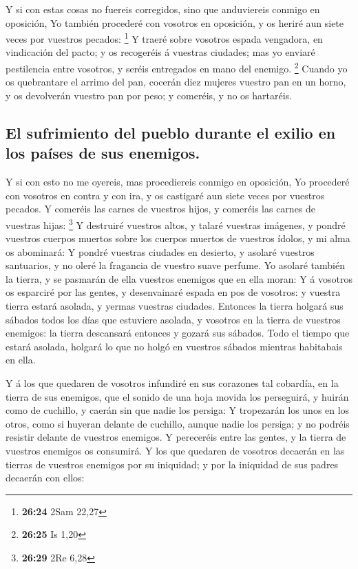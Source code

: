  Y si con estas cosas no fuereis corregidos, sino que
anduviereis conmigo en oposición,  Yo también procederé
con vosotros en oposición, y os heriré aun siete veces por vuestros
pecados: \footnote{\textbf{26:24} 2Sam 22,27}  Y traeré
sobre vosotros espada vengadora, en vindicación del pacto; y os
recogeréis á vuestras ciudades; mas yo enviaré pestilencia entre
vosotros, y seréis entregados en mano del enemigo. \footnote{\textbf{26:25}
  Is 1,20}  Cuando yo os quebrantare el arrimo del pan,
cocerán diez mujeres vuestro pan en un horno, y os devolverán vuestro
pan por peso; y comeréis, y no os hartaréis.

\hypertarget{el-sufrimiento-del-pueblo-durante-el-exilio-en-los-pauxedses-de-sus-enemigos.}{%
\subsection{El sufrimiento del pueblo durante el exilio en los países de
sus
enemigos.}\label{el-sufrimiento-del-pueblo-durante-el-exilio-en-los-pauxedses-de-sus-enemigos.}}

 Y si con esto no me oyereis, mas procediereis conmigo en
oposición,  Yo procederé con vosotros en contra y con
ira, y os castigaré aun siete veces por vuestros pecados.
 Y comeréis las carnes de vuestros hijos, y comeréis las
carnes de vuestras hijas: \footnote{\textbf{26:29} 2Re 6,28}
 Y destruiré vuestros altos, y talaré vuestras imágenes,
y pondré vuestros cuerpos muertos sobre los cuerpos muertos de vuestros
ídolos, y mi alma os abominará:  Y pondré vuestras
ciudades en desierto, y asolaré vuestros santuarios, y no oleré la
fragancia de vuestro suave perfume.  Yo asolaré también
la tierra, y se pasmarán de ella vuestros enemigos que en ella moran:
 Y á vosotros os esparciré por las gentes, y desenvainaré
espada en pos de vosotros: y vuestra tierra estará asolada, y yermas
vuestras ciudades.  Entonces la tierra holgará sus
sábados todos los días que estuviere asolada, y vosotros en la tierra de
vuestros enemigos: la tierra descansará entonces y gozará sus sábados.
 Todo el tiempo que estará asolada, holgará lo que no
holgó en vuestros sábados mientras habitabais en ella.

 Y á los que quedaren de vosotros infundiré en sus
corazones tal cobardía, en la tierra de sus enemigos, que el sonido de
una hoja movida los perseguirá, y huirán como de cuchillo, y caerán sin
que nadie los persiga:  Y tropezarán los unos en los
otros, como si huyeran delante de cuchillo, aunque nadie los persiga; y
no podréis resistir delante de vuestros enemigos.  Y
pereceréis entre las gentes, y la tierra de vuestros enemigos os
consumirá.  Y los que quedaren de vosotros decaerán en
las tierras de vuestros enemigos por su iniquidad; y por la iniquidad de
sus padres decaerán con ellos:

